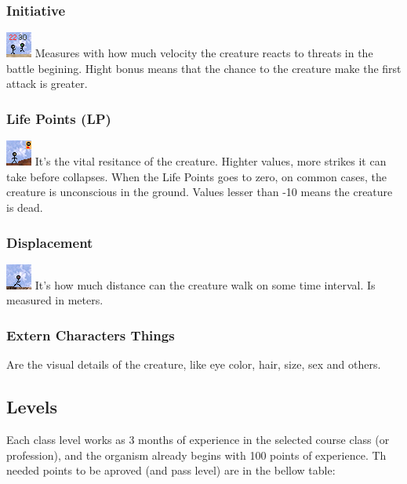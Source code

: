 \documentclass[ letterpaper,12pt]{article}
\begin{document}
\subsubsection{Initiative}
\includegraphics{../data/skills/Img/iniciativa.png}
Measures with how much velocity the creature reacts to threats in the battle begining. Hight bonus means that the chance to the creature make the first attack is greater.

\subsubsection{Life Points (LP)}
\includegraphics{../data/skills/Img/pv.png}
It's the vital resitance of the creature. Highter values, more strikes it can take before collapses. When the Life Points goes to zero, on common cases, the creature is unconscious in the ground. Values lesser than -10 means the creature is dead.

\subsubsection{Displacement}
\includegraphics{../data/skills/Img/deslocamento.png}
It's how much distance can the creature walk on some time interval. Is measured in meters.

\subsubsection{Extern Characters Things}
Are the visual details of the creature, like eye color, hair, size, sex and others.

\subsection{Levels}

Each class level works as 3 months of experience in the selected course class
(or profession), and the organism already begins with 100 points of experience.
Th needed points to be aproved (and pass level) are in the bellow table:
\end{document}

